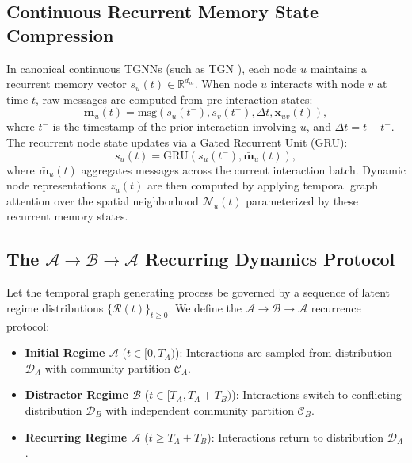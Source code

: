 \documentclass[10pt,twocolumn,letterpaper]{article}
\begin{document}
\subsection{Continuous Recurrent Memory State Compression}
In canonical continuous TGNNs (such as TGN \citep{rossi2020temporal}), each node $u$ maintains a recurrent memory vector $s_u(t) \in \mathbb{R}^{d_m}$. When node $u$ interacts with node $v$ at time $t$, raw messages are computed from pre-interaction states:
\begin{equation}
    \mathbf{m}_u(t) = \text{msg}(s_u(t^-), s_v(t^-), \Delta t, \mathbf{x}_{uv}(t)),
\end{equation}
where $t^-$ is the timestamp of the prior interaction involving $u$, and $\Delta t = t - t^-$. The recurrent node state updates via a Gated Recurrent Unit (GRU):
\begin{equation}
    s_u(t) = \text{GRU}(s_u(t^-), \bar{\mathbf{m}}_u(t)),
\end{equation}
where $\bar{\mathbf{m}}_u(t)$ aggregates messages across the current interaction batch. Dynamic node representations $z_u(t)$ are then computed by applying temporal graph attention over the spatial neighborhood $\mathcal{N}_u(t)$ parameterized by these recurrent memory states.

\subsection{The $\mathcal{A} \to \mathcal{B} \to \mathcal{A}$ Recurring Dynamics Protocol}
Let the temporal graph generating process be governed by a sequence of latent regime distributions $\{\mathcal{R}(t)\}_{t \ge 0}$. We define the $\mathcal{A} \to \mathcal{B} \to \mathcal{A}$ recurrence protocol:
\begin{itemize}
    \item \textbf{Initial Regime $\mathcal{A}$} ($t \in [0, T_A)$): Interactions are sampled from distribution $\mathcal{D}_A$ with community partition $\mathcal{C}_A$.
    \item \textbf{Distractor Regime $\mathcal{B}$} ($t \in [T_A, T_A + T_B)$): Interactions switch to conflicting distribution $\mathcal{D}_B$ with independent community partition $\mathcal{C}_B$.
    \item \textbf{Recurring Regime $\mathcal{A}$} ($t \ge T_A + T_B$): Interactions return to distribution $\mathcal{D}_A$.
\end{itemize}
\end{document}
